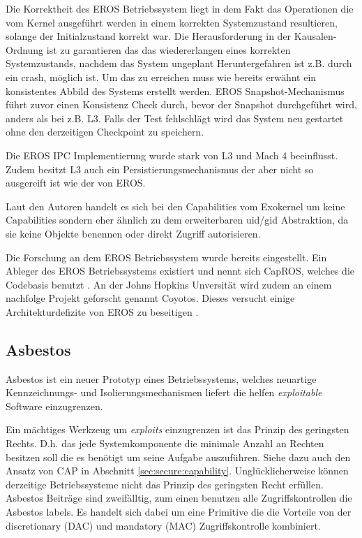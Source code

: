 \documentclass[11pt,technote]{IEEEtran}
\begin{document}
      Die Korrektheit des EROS Betriebssystem liegt in dem Fakt das Operationen die vom Kernel ausgef\"uhrt werden  
      in einem korrekten Systemzustand resultieren, solange der Initialzustand korrekt war. Die Herausforderung in der Kausalen-Ordnung ist
      zu garantieren das das wiedererlangen eines korrekten Systemzustands, nachdem das System ungeplant Heruntergefahren ist z.B. durch ein crash, m\"oglich ist.
      Um das zu erreichen muss wie bereits erw\"ahnt ein konsistentes Abbild des Systems erstellt werden.
      EROS Snapshot-Mechanismus f\"uhrt zuvor einen Konsistenz Check durch, bevor der Snapshot durchgef\"uhrt wird, 
      anders als bei z.B. L3. Falls der Test fehlschl\"agt wird das System neu gestartet ohne den derzeitigen Checkpoint zu speichern. 
 
      Die EROS IPC Implementierung wurde stark von L3 und Mach 4 beeinflusst. Zudem besitzt L3 auch ein Persistierungsmechanismus der aber nicht so ausgereift 
      ist wie der von EROS.
        
      Laut den Autoren \cite{inproc:eros} handelt es sich bei den Capabilities vom Exokernel um keine 
      Capabilities sondern eher \"ahnlich zu dem erweiterbaren uid/gid Abstraktion, da sie keine Objekte benennen oder direkt Zugriff autorisieren.
      
      Die Forschung an dem EROS Betriebssystem wurde bereits eingestellt. Ein Ableger des EROS Betriebssystems
      existiert und nennt sich CapROS, welches die Codebasis benutzt \cite{Url:capros}. An der Johns Hopkins Unversit\"at wird zudem an einem 
      nachfolge Projekt geforscht genannt Coyotos. Dieses versucht einige Architekturdefizite von EROS zu beseitigen \cite{Url:coyotos}.
      
    \subsection{Asbestos}        
      Asbestos ist ein neuer Prototyp eines Betriebssystems, welches neuartige Kennzeichnungs- und Isolierungsmechanismen 
      liefert die helfen \textit{exploitable} Software einzugrenzen.

      Ein m\"achtiges Werkzeug um \textit{exploits} einzugrenzen ist das Prinzip des geringsten Rechts.
      D.h. das jede Systemkomponente die minimale Anzahl an Rechten besitzen soll die es ben\"otigt um seine Aufgabe auszuf\"uhren.
      Siehe dazu auch den Ansatz von CAP in Abschnitt \ref{sec:secure:capability}. Ungl\"ucklicherweise k\"onnen derzeitige Betriebssysteme 
      nicht das Prinzip des geringsten Recht erf\"ullen. Asbestos Beitr\"age sind zweif\"alltig, zum einen benutzen alle Zugriffskontrollen die Asbestos labels. 
      Es handelt sich dabei um eine Primitive die die Vorteile von der discretionary (DAC) und mandatory (MAC) Zugriffskontrolle kombiniert.
      
\end{document}
